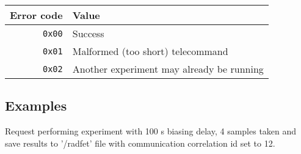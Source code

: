 \begin{tabular}{r | l}
    Error code & Value \\
    \hline
    \texttt{0x00}   & Success \\
    \texttt{0x01}   & Malformed (too short) telecommand \\
    \texttt{0x02}   & Another experiment may already be running \\
\end{tabular}

\subsection{Examples}
Request performing \radfet experiment with 100 s biasing delay, 4 samples taken and save results
to '/radfet' file with communication correlation id set to 12.

